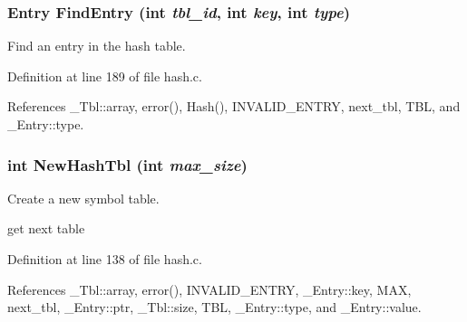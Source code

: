 \subsubsection{\setlength{\rightskip}{0pt plus 5cm}\bf{Entry} Find\-Entry (int {\em tbl\_\-id}, int {\em key}, int {\em type})}\label{hash_8h_7f132fbd09fb46c0324910a2241fc647}


Find an entry in the hash table. 

Definition at line 189 of file hash.c.

References \_\-Tbl::array, error(), Hash(), INVALID\_\-ENTRY, next\_\-tbl, TBL, and \_\-Entry::type.
\subsubsection{\setlength{\rightskip}{0pt plus 5cm}int New\-Hash\-Tbl (int {\em max\_\-size})}\label{hash_8h_4ee45a0996e73169eec001797c7d259a}


Create a new symbol table. 

get next table 

Definition at line 138 of file hash.c.

References \_\-Tbl::array, error(), INVALID\_\-ENTRY, \_\-Entry::key, MAX, next\_\-tbl, \_\-Entry::ptr, \_\-Tbl::size, TBL, \_\-Entry::type, and \_\-Entry::value.